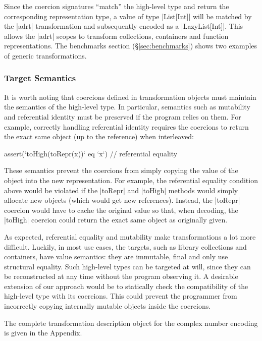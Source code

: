 Since the coercion signatures ``match'' the high-level type and return the corresponding representation type, a value of type |List[Int]| will be matched by the |adrt| transformation and subsequently encoded as a |LazyList[Int]|. This allows the |adrt| scopes to transform collections, containers and function representations. The benchmarks section (\S\ref{sec:benchmarks}) shows two examples of generic transformations.


\subsubsection*{Target Semantics}

It is worth noting that coercions defined in transformation objects must maintain the semantics of the high-level type. In particular, semantics such as mutability and referential identity must be preserved if the program relies on them. For example, correctly handling referential identity requires the coercions to return the exact same object (up to the reference) when interleaved:

\begin{lstlisting-nobreak}
assert(`toHigh(toRepr(x))` eq `x`) // referential equality
\end{lstlisting-nobreak}

These semantics prevent the coercions from simply copying the value of the object into the new representation.
For example, the referential equality condition above would be violated if the |toRepr| and |toHigh| methods would simply allocate new objects (which would get new references). Instead, the |toRepr| coercion would have to cache the original value so that, when decoding, the |toHigh| coercion could return the exact same object as originally given.

As expected, referential equality and mutability make transformations a lot more difficult. Luckily, in most use cases, the targets, such as library collections and containers, have value semantics: they are immutable, final and only use structural equality. Such high-level types can be targeted at will, since they can be reconstructed at any time without the program observing it. A desirable extension of our approach would be to statically check the compatibility of the high-level type with its coercions. This could prevent the programmer from incorrectly copying internally mutable objects inside the coercions.

The complete transformation description object for the complex number encoding is given in the Appendix.

